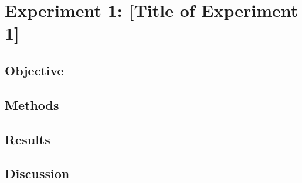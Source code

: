 
\section{Experiment 1: [Title of Experiment 1]}
\subsection{Objective}

\subsection{Methods}

\subsection{Results}

\subsection{Discussion}
